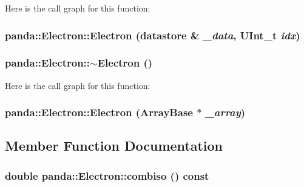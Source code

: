 Here is the call graph for this function:\hypertarget{classpanda_1_1Electron_ac799df2aad67e3d34c3d71bc6848cc91}{
\subsubsection[{Electron}]{\setlength{\rightskip}{0pt plus 5cm}panda::Electron::Electron ({\bf datastore} \& {\em \_\-data}, \/  UInt\_\-t {\em idx})}}
\label{classpanda_1_1Electron_ac799df2aad67e3d34c3d71bc6848cc91}
\hypertarget{classpanda_1_1Electron_a279592af2591ccab5cf7e6d4527dcb56}{
\subsubsection[{$\sim$Electron}]{\setlength{\rightskip}{0pt plus 5cm}panda::Electron::$\sim$Electron ()}}
\label{classpanda_1_1Electron_a279592af2591ccab5cf7e6d4527dcb56}


Here is the call graph for this function:\hypertarget{classpanda_1_1Electron_a1a164e9604f2796faf0702bb82a08fc6}{
\subsubsection[{Electron}]{\setlength{\rightskip}{0pt plus 5cm}panda::Electron::Electron ({\bf ArrayBase} $\ast$ {\em \_\-array})}}
\label{classpanda_1_1Electron_a1a164e9604f2796faf0702bb82a08fc6}


\subsection{Member Function Documentation}
\hypertarget{classpanda_1_1Electron_a68eb50798d64b6bafaa21aac9e67f0d6}{
\subsubsection[{combiso}]{\setlength{\rightskip}{0pt plus 5cm}double panda::Electron::combiso () const}}
\label{classpanda_1_1Electron_a68eb50798d64b6bafaa21aac9e67f0d6}


